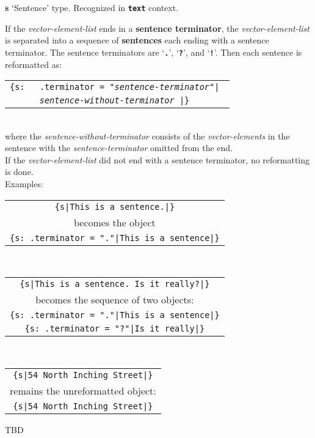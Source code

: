 \documentclass[12pt]{article}
\newcommand{\TT}[1]{{\tt \bfseries #1}}
\newcommand{\key}[1]{{\rm \bfseries #1}}
\newenvironment{indpar}[1][0.3in]%
	{\begin{list}{}%
		     {\setlength{\itemsep}{0in}%
		      \setlength{\topsep}{0in}%
		      \setlength{\parsep}{1ex}%
		      \setlength{\labelwidth}{#1}%
		      \setlength{\leftmargin}{#1}%
		      \addtolength{\leftmargin}{\labelsep}}%
	 \item}%
	{\end{list}}
\begin{document}
{\bf s} \hfill `Sentence' type. \hfill Recognized in \TT{text} context.
\begin{indpar}[0.2in]
If the {\em vector-element-list}
ends in a \key{sentence terminator},
the {\em vector-element-list} is separated into a sequence of
\key{sentences} each ending with a sentence terminator.
The sentence terminators are `\TT{.}', `\TT{?}', and `\TT{!}'.
Then each sentence is reformatted as: \\
\hspace*{0.2in}\begin{tabular}{rl}
\tt \{s: & \tt .terminator = "{\em sentence-terminator}"| \\
         & \tt {\em sentence-without-terminator} |\}
\end{tabular}
\\[2ex]
where the {\em sentence-without-terminator} consists of the
{\em vector-elements} in the sentence with the {\em sentence-terminator}
omitted from the end.
\\[0.5ex]
If the {\em vector-element-list} did not end with a sentence terminator,
no reformatting is done.
\\[0.5ex]
Examples:
\\[1ex]
\begin{tabular}{c}
{\tt \{s|This is a sentence.|\}} \\
becomes the object \\
{\tt \{s:~.terminator = "."|This is a sentence|\}}
\end{tabular}
\\[5ex]
\begin{tabular}{c}
{\tt \{s|This is a sentence.  Is it really?|\}} \\
becomes the sequence of two objects: \\
{\tt \{s:~.terminator = "."|This is a sentence|\}} \\
{\tt \{s:~.terminator = "?"|Is it really|\}} \\
\end{tabular}
\\[5ex]
\begin{tabular}{c}
{\tt \{s|54 North Inching Street|\}} \\
remains the unreformatted object: \\
{\tt \{s|54 North Inching Street|\}} \\
\end{tabular}
\end{indpar}

TBD
\end{document}
